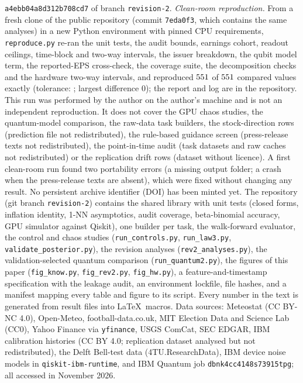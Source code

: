 \documentclass[journal]{IEEEtran}
\theoremstyle{definition}
\begin{document}
\texttt{\small a4ebb04a8d312b708cd7} of branch \texttt{revision-2}. \emph{Clean-room reproduction.} From a fresh clone of the public repository (commit \texttt{7eda0f3}, which contains the same analyses) in a new Python environment with pinned CPU requirements, \texttt{reproduce.py} re-ran the unit tests, the audit bounds, earnings cohort, readout ceilings, time-block and two-way intervals, the issuer breakdown, the qubit model term, the reported-EPS cross-check, the coverage suite, the decomposition checks and the hardware two-way intervals, and reproduced $551$ of $551$ compared values exactly (tolerance: \rpTol; largest difference $0$); the report and log are in the repository. This run was performed by the author on the author's machine and is not an independent reproduction. It does not cover the GPU chaos studies, the quantum-model comparison, the raw-data task builders, the stock-direction rows (prediction file not redistributed), the rule-based guidance screen (press-release texts not redistributed), the point-in-time audit (task datasets and raw caches not redistributed) or the replication drift rows (dataset without licence). A first clean-room run found two portability errors (a missing output folder; a crash when the press-release texts are absent), which were fixed without changing any result. No persistent archive identifier (DOI) has been minted yet. The repository (git branch \texttt{revision-2}) contains the shared library with unit tests (closed forms, inflation identity, 1-NN asymptotics, audit coverage, beta-binomial accuracy, GPU simulator against Qiskit), one builder per task, the walk-forward evaluator, the control and chaos studies (\texttt{run\_controls.py}, \texttt{run\_law3.py}, \texttt{validate\_posterior.py}), the revision analyses (\texttt{rev2\_analyses.py}), the validation-selected quantum comparison (\texttt{run\_quantum2.py}), the figures of this paper (\texttt{fig\_know.py}, \texttt{fig\_rev2.py}, \texttt{fig\_hw.py}), a feature-and-timestamp specification with the leakage audit, an environment lockfile, file hashes, and a manifest mapping every table and figure to its script. Every number in the text is generated from result files into \LaTeX\ macros. Data sources: Meteostat (CC BY-NC 4.0), Open-Meteo, football-data.co.uk, MIT Election Data and Science Lab (CC0), Yahoo Finance via \texttt{yfinance}, USGS ComCat, SEC EDGAR, IBM calibration histories (CC BY 4.0; replication dataset analysed but not redistributed), the Delft Bell-test data (4TU.ResearchData), IBM device noise models in \texttt{qiskit-ibm-runtime}, and IBM Quantum job \texttt{dbnk4cc4148s73915tpg}; all accessed in November 2026.
\end{document}
